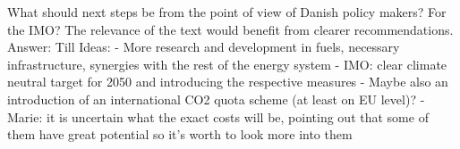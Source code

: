What should next steps be from the point of view of Danish policy makers? For the IMO? The relevance of the text would benefit from clearer recommendations. 
Answer: Till
Ideas:
- More research and development in fuels, necessary infrastructure, synergies with the rest of the energy system
- IMO: clear climate neutral target for 2050 and introducing the respective measures
- Maybe also an introduction of an international CO2 quota scheme (at least on EU level)?
- Marie: it is uncertain what the exact costs will be, pointing out that some of them have great potential so it's worth to look more into them



